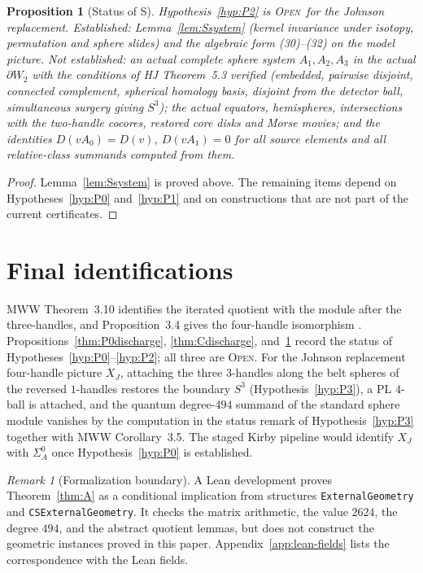 \documentclass[11pt]{amsart}
\newtheorem{proposition}[theorem]{Proposition}
\theoremstyle{definition}
\theoremstyle{remark}
\newtheorem{remark}[theorem]{Remark}
\newcommand{\Open}{\textnormal{\textsc{Open}}}
\begin{document}
\begin{proposition}[Status of S]\label{thm:Sdischarge}
Hypothesis~\ref{hyp:P2} is \Open\ for the Johnson replacement.
Established: Lemma~\ref{lem:Ssystem} (kernel invariance under isotopy,
permutation and sphere slides) and the algebraic form (30)--(32) on the
model picture.  Not established: an actual complete sphere system
$A_1,A_2,A_3$ in the actual $\partial W_2$ with the conditions of HJ
Theorem~5.3 verified (embedded, pairwise disjoint, connected complement,
spherical homology basis, disjoint from the detector ball, simultaneous
surgery giving $S^3$); the actual equators, hemispheres, intersections with
the two-handle cocores, restored core disks and Morse movies; and the
identities $D(vA_0)=D(v)$, $D(vA_1)=0$ for all source elements and all
relative-class summands computed from them.
\end{proposition}

\begin{proof}
Lemma~\ref{lem:Ssystem} is proved above.  The remaining items depend on
Hypotheses~\ref{hyp:P0} and~\ref{hyp:P1} and on constructions that are not
part of the current certificates.
\end{proof}

\section{Final identifications}\label{sec:final-identifications}

MWW Theorem~3.10 identifies the iterated quotient with the module after the
three-handles, and Proposition~3.4 gives the four-handle isomorphism
\cite{ManolescuWalkerWedrich2023}.  Propositions~\ref{thm:P0discharge},
\ref{thm:Cdischarge}, and~\ref{thm:Sdischarge} record the status of
Hypotheses~\ref{hyp:P0}--\ref{hyp:P2}; all three are \Open.  For the Johnson
replacement four-handle picture $X_J$, attaching the three $3$-handles
along the belt spheres of the reversed $1$-handles restores the boundary
$S^3$ (Hypothesis~\ref{hyp:P3}), a PL $4$-ball is attached, and the quantum
degree-$494$ summand of the standard sphere module vanishes by the
computation in the status remark of Hypothesis~\ref{hyp:P3} together with
MWW Corollary~3.5.  The staged Kirby pipeline would identify $X_J$ with
$\Sigma_A^0$ once Hypothesis~\ref{hyp:P0} is established.

\begin{remark}[Formalization boundary]\label{rem:lean-boundary}
A Lean development \cite{Lean4} proves Theorem~\ref{thm:A} as a conditional
implication from structures \texttt{ExternalGeometry} and
\texttt{CSExternalGeometry}.  It checks the matrix arithmetic, the value
$2624$, the degree $494$, and the abstract quotient lemmas, but does not
construct the geometric instances proved in this paper.  Appendix~\ref{app:lean-fields}
lists the correspondence with the Lean fields.
\end{remark}
\end{document}
